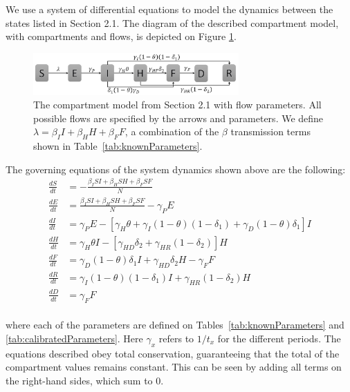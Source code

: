 We use a system of differential equations to model the dynamics between the states listed in Section 2.1. The diagram of the described compartment model, with compartments and flows, is depicted on Figure \ref{fig:compartment}. \\


\begin{figure}[!h]
  \centering
  \includegraphics[width=0.7\textwidth]{compartment}
  \caption{The compartment model from Section 2.1 with flow parameters. All possible flows are specified by the arrows and parameters. We define $\lambda = \beta_{I}I+\beta_{H}H+\beta_{F}F $, a combination of the $\beta$ transmission terms shown in Table~\ref{tab:knownParameters}. } 
\label{fig:compartment} 
\end{figure}


The governing equations of the system dynamics shown above are the following:
\begin{align}
\frac{dS}{dt} &= - \frac{\beta_{I}SI+\beta_{H}SH+\beta_{F}SF}{N} \label{eqn:SD1}\\
\frac{dE}{dt} &=  \frac{\beta_{I}SI+\beta_{H}SH+\beta_{F}SF}{N}-\gamma_P E         \label{eqn:SD2}\\
\frac{dI}{dt} &=  \gamma_P E - [\gamma_{H}\theta + \gamma_{I}(1-\theta)(1-\delta_{1})+\gamma_{D}(1-\theta)\delta_{1}]I \label{eqn:SD3}\\
\frac{dH}{dt} &= \gamma_{H}\theta I - [\gamma_{HD}\delta_{2}+\gamma_{HR}(1-\delta_{2})]H \label{eqn:SD4}\\
\frac{dF}{dt} &= \gamma_{D}(1-\theta) \delta_{1} I + \gamma_{HD}\delta_{2} H-\gamma_{F} F  \label{eqn:SD5}\\
\frac{dR}{dt} &= \gamma_{I}(1-\theta)(1- \delta_{1}) I + \gamma_{HR}(1-\delta_{2}) H       \label{eqn:SD6}\\
\frac{dD}{dt} &= \gamma_{F} F  \label{eqn:SD7}
\end{align}\\
where each of the parameters are defined on Tables~\ref{tab:knownParameters} and \ref{tab:calibratedParameters}. Here $\gamma_x$ refers to $1/t_x$ for the different periods. The equations described obey total conservation, guaranteeing that the total of the compartment values remains constant. This can be seen by adding all terms on the right-hand sides, which sum to 0. 



